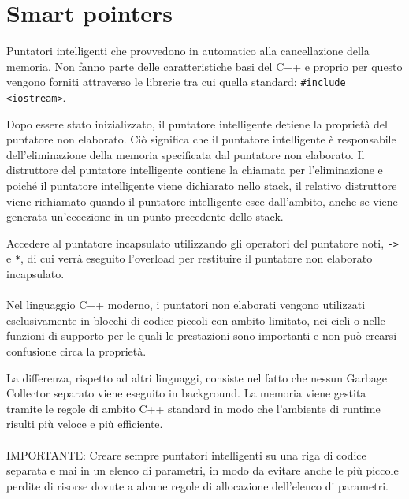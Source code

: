 \section{Smart pointers}
Puntatori intelligenti che provvedono in automatico alla cancellazione della memoria. Non fanno parte delle caratteristiche basi del C++ e proprio per questo vengono forniti attraverso le librerie tra cui quella standard: \verb|#include <iostream>|.

Dopo essere stato inizializzato, il puntatore intelligente detiene la proprietà del puntatore non elaborato. Ciò significa che il puntatore intelligente è responsabile dell'eliminazione della memoria specificata dal puntatore non elaborato. Il distruttore del puntatore intelligente contiene la chiamata per l'eliminazione e poiché il puntatore intelligente viene dichiarato nello stack, il relativo distruttore viene richiamato quando il puntatore intelligente esce dall'ambito, anche se viene generata un'eccezione in un punto precedente dello stack.

Accedere al puntatore incapsulato utilizzando gli operatori del puntatore noti, \verb|->| e \verb|*|, di cui verrà eseguito l'overload per restituire il puntatore non elaborato incapsulato.

\paragraph{}
Nel linguaggio C++ moderno, i puntatori non elaborati vengono utilizzati esclusivamente in blocchi di codice piccoli con ambito limitato, nei cicli o nelle funzioni di supporto per le quali le prestazioni sono importanti e non può crearsi confusione circa la proprietà.

La differenza, rispetto ad altri linguaggi, consiste nel fatto che nessun Garbage Collector separato viene eseguito in background. La memoria viene gestita tramite le regole di ambito C++ standard in modo che l'ambiente di runtime risulti più veloce e più efficiente.
\paragraph{}
IMPORTANTE: Creare sempre puntatori intelligenti su una riga di codice separata e mai in un elenco di parametri, in modo da evitare anche le più piccole perdite di risorse dovute a alcune regole di allocazione dell'elenco di parametri.







